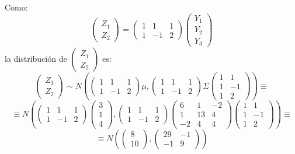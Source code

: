 \documentclass[11pt,a4paper]{article}
\begin{document}
\begin{enumerate}[label=\arabic*.]
\begin{enumerate}[label=\arabic*)]
Como:
$$\begin{pmatrix} Z_{1} \\ Z_{2} \end{pmatrix} = \begin{pmatrix}
1 & 1 & 1 \\
1 & -1 & 2
\end{pmatrix} \begin{pmatrix} Y_{1} \\ Y_{2} \\ Y_{3} \end{pmatrix}$$
la distribución de $\begin{pmatrix} Z_{1} \\ Z_{2} \end{pmatrix}$ es:
$$\begin{pmatrix} Z_{1} \\ Z_{2} \end{pmatrix} \sim N(\begin{pmatrix}
1 & 1 & 1 \\
1 & -1 & 2
\end{pmatrix} \mu, \begin{pmatrix}
1 & 1 & 1 \\
1 & -1 & 2
\end{pmatrix} \Sigma \begin{pmatrix}
1 & 1 \\
1 & -1 \\
1 & 2
\end{pmatrix}) \equiv$$
$$\equiv N(\begin{pmatrix}
1 & 1 & 1 \\
1 & -1 & 2
\end{pmatrix} \begin{pmatrix} 3 \\ 1 \\ 4 \end{pmatrix}, \begin{pmatrix}
1 & 1 & 1 \\
1 & -1 & 2
\end{pmatrix} \begin{pmatrix}
6 & 1 & -2 \\
1 & 13 & 4 \\
-2 & 4 & 4
\end{pmatrix} \begin{pmatrix}
1 & 1 \\
1 & -1 \\
1 & 2
\end{pmatrix}) \equiv$$
$$\equiv N(\begin{pmatrix} 8 \\ 10 \end{pmatrix}, \begin{pmatrix}
29 & -1 \\
-1 & 9
\end{pmatrix})$$


\end{enumerate}
\end{enumerate}
\end{document}

